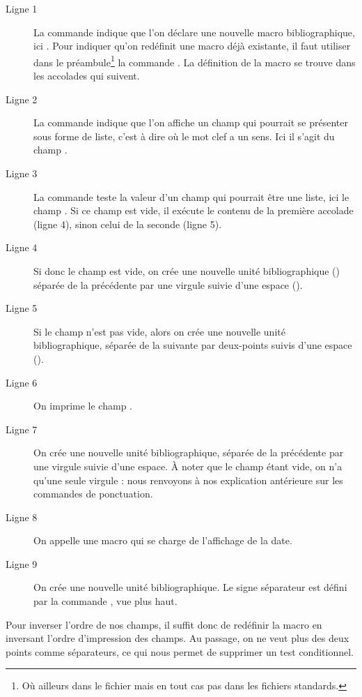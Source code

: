 \begin{description}
\item[Ligne 1] La commande  indique que l'on déclare une nouvelle macro bibliographique, ici . Pour indiquer qu'on redéfinit une macro déjà existante, il faut utiliser dans le préambule\footnote{Où ailleurs dans le fichier  mais en tout cas pas dans les fichiers standards.} la commande . La définition de la macro se trouve dans les accolades qui suivent.
\item[Ligne 2] La commande  indique que l'on affiche un champ qui pourrait se présenter sous forme de liste, c'est à dire où le mot clef  a un sens. Ici il s'agit du champ .
\item[Ligne 3] La commande  teste la valeur d'un champ qui pourrait être une liste, ici le champ . Si ce champ est vide, il exécute le contenu de la première accolade (ligne 4), sinon celui de la seconde (ligne 5).
\item[Ligne 4] Si donc le champ  est vide, on crée une nouvelle unité bibliographique ()\label{unitepersonalisee} séparée de la précédente par une virgule suivie d'une espace ().
\item[Ligne 5] Si le champ  n'est pas vide, alors on crée une nouvelle unité bibliographique, séparée de la suivante par deux-points suivis d'une espace ().
\item[Ligne 6] On imprime le champ .
\item[Ligne 7] On crée une nouvelle unité bibliographique, séparée de la précédente par une virgule suivie d'une espace. À noter que le champ  étant vide, on n'a qu'une seule virgule : nous renvoyons à nos explication antérieure sur les commandes de ponctuation.
\item[Ligne 8] On appelle une macro qui se charge de l'affichage de la date.
\item[Ligne 9] On crée une nouvelle unité bibliographique. Le signe séparateur est défini par la commande , vue plus haut.
\end{description}

Pour inverser l'ordre de nos champs, il suffit donc de redéfinir la macro en inversant l'ordre d'impression des champs. Au passage, on ne veut plus des deux points comme séparateurs, ce qui nous permet de supprimer un test conditionnel.


